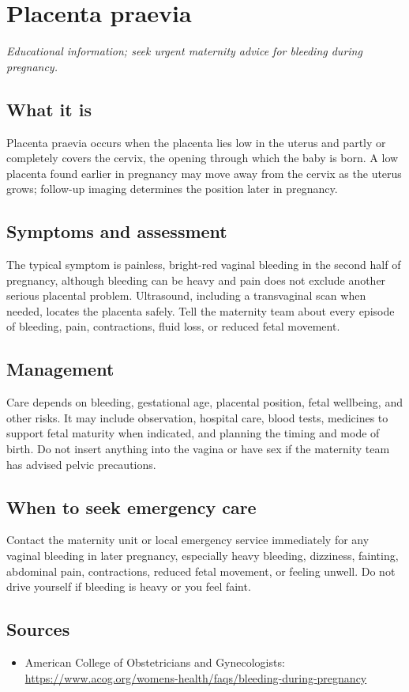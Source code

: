\chapter{Placenta praevia}

\medskip
\noindent\textit{Educational information; seek urgent maternity advice for bleeding during pregnancy.}

\section*{What it is}
Placenta praevia occurs when the placenta lies low in the uterus and partly or completely covers the cervix, the opening through which the baby is born. A low placenta found earlier in pregnancy may move away from the cervix as the uterus grows; follow-up imaging determines the position later in pregnancy.

\section*{Symptoms and assessment}
The typical symptom is painless, bright-red vaginal bleeding in the second half of pregnancy, although bleeding can be heavy and pain does not exclude another serious placental problem. Ultrasound, including a transvaginal scan when needed, locates the placenta safely. Tell the maternity team about every episode of bleeding, pain, contractions, fluid loss, or reduced fetal movement.

\section*{Management}
Care depends on bleeding, gestational age, placental position, fetal wellbeing, and other risks. It may include observation, hospital care, blood tests, medicines to support fetal maturity when indicated, and planning the timing and mode of birth. Do not insert anything into the vagina or have sex if the maternity team has advised pelvic precautions.

\section*{When to seek emergency care}
Contact the maternity unit or local emergency service immediately for any vaginal bleeding in later pregnancy, especially heavy bleeding, dizziness, fainting, abdominal pain, contractions, reduced fetal movement, or feeling unwell. Do not drive yourself if bleeding is heavy or you feel faint.

\section*{Sources}
\begin{itemize}
\item American College of Obstetricians and Gynecologists: \url{https://www.acog.org/womens-health/faqs/bleeding-during-pregnancy}
\end{itemize}
